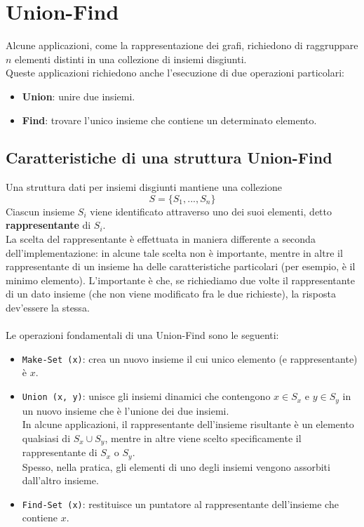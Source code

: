 \chapter{Union-Find}
Alcune applicazioni, come la rappresentazione dei grafi, richiedono di raggruppare $n$ elementi distinti in una collezione di insiemi disgiunti.\\
Queste applicazioni richiedono anche l'esecuzione di due operazioni particolari:
    \begin{itemize}
        \item{\textbf{Union}: unire due insiemi.}
        \item{\textbf{Find}: trovare l'unico insieme che contiene un determinato elemento.}
    \end{itemize}

\section{Caratteristiche di una struttura Union-Find}
Una struttura dati per insiemi disgiunti mantiene una collezione 
    \begin{equation}
        S = \{S_1, ..., S_n\}
    \end{equation}
Ciascun insieme $S_i$ viene identificato attraverso uno dei suoi elementi, detto \textbf{rappresentante} di $S_i$.\\
La scelta del rappresentante è effettuata in maniera differente a seconda dell'implementazione: in alcune tale scelta non è importante, mentre in altre il rappresentante di un insieme ha delle caratteristiche particolari (per esempio, è il minimo elemento). L'importante è che, se richiediamo due volte il rappresentante di un dato insieme (che non viene modificato fra le due richieste), la risposta dev'essere la stessa.\\\\
Le operazioni fondamentali di una Union-Find sono le seguenti:
    \begin{itemize}
        \item{\texttt{Make-Set (x)}: crea un nuovo insieme il cui unico elemento (e rappresentante) è $x$.}
        \item{\texttt{Union (x, y)}: unisce gli insiemi dinamici che contengono $x \in S_x$ e $y \in S_y$ in un nuovo insieme che è l'unione dei due insiemi.\\
        In alcune applicazioni, il rappresentante dell'insieme risultante è un elemento qualsiasi di $S_x \cup S_y$, mentre in altre viene scelto specificamente il rappresentante di $S_x$ o $S_y$.\\
        Spesso, nella pratica, gli elementi di uno degli insiemi vengono assorbiti dall'altro insieme.}
        \item{\texttt{Find-Set (x)}: restituisce un puntatore al rappresentante dell'insieme che contiene $x$.}
    \end{itemize}


